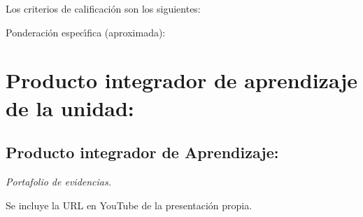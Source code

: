 Los criterios de calificaci\'{o}n son los siguientes:

  
Ponderaci\'{o}n espec\'{\i}fica (aproximada):

 

\section{Producto integrador de aprendizaje de la unidad:}

\subsection{Producto integrador de Aprendizaje:}

{\em Portafolio de evidencias.}

Se incluye la URL en YouTube de la presentaci\'{o}n propia.


